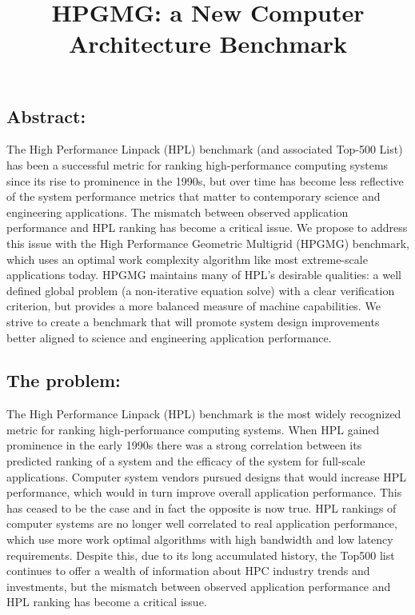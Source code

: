 \documentclass[11pt]{amsart}
\title{HPGMG: a New Computer Architecture Benchmark}
\begin{document}
\maketitle

\subsection*{Abstract:} 
The High Performance Linpack (HPL) benchmark (and associated Top-500 List) has been a successful metric for ranking high-performance computing systems since its rise to prominence in the 1990s, but over time has become less reflective of the system performance metrics that matter to contemporary science and engineering applications.
The mismatch between observed application performance and HPL ranking has become a critical issue. 
We propose to address this issue with the High Performance Geometric Multigrid (HPGMG) benchmark, which uses an optimal work complexity algorithm like most extreme-scale applications today.
HPGMG maintains many of HPL's desirable qualities: a well defined global problem (a non-iterative equation solve) with a clear verification criterion, but provides a more balanced measure of machine capabilities.
We strive to create a benchmark that will promote system design improvements better aligned to science and engineering application performance.

\subsection*{The problem:} 
The High Performance Linpack (HPL) benchmark is the most widely recognized metric for ranking high-performance computing systems. 
When HPL gained prominence in the early 1990s there was a strong correlation between its predicted ranking of a system and the efficacy of the system for full-scale applications.
Computer system vendors pursued designs that would increase HPL performance, which would in turn improve overall application performance.
This has ceased to be the case and in fact the opposite is now true.
HPL rankings of computer systems are no longer well correlated to real application performance, which use more work optimal algorithms with high bandwidth and low latency requirements.
Despite this, due to its long accumulated history, the Top500 list continues to offer a wealth of information about HPC industry trends and investments, but the mismatch between observed application performance and HPL ranking has become a critical issue. 
\end{document}
